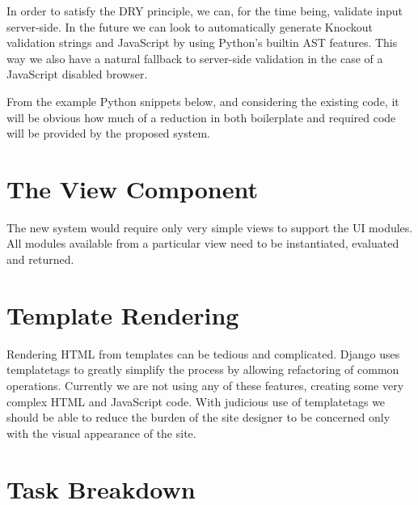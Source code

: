 \documentclass[12pt]{scrartcl}
\begin{document}
In order to satisfy the DRY principle, we can, for the time being, validate input server-side.
In the future we can look to automatically generate Knockout validation strings and JavaScript
by using Python's builtin AST features. This way we also have a natural fallback to server-side
validation in the case of a JavaScript disabled browser.

From the example Python snippets below, and considering the existing code, it will be obvious
how much of a reduction in both boilerplate and required code will be provided by the proposed
system.





\section{The View Component}

The new system would require only very simple views to support the UI modules. All modules
available from a particular view need to be instantiated, evaluated and returned.



\section{Template Rendering}

Rendering HTML from templates can be tedious and complicated. Django uses templatetags to greatly
simplify the process by allowing refactoring of common operations. Currently we are not using any
of these features, creating some very complex HTML and JavaScript code. With judicious use of
templatetags we should be able to reduce the burden of the site designer to be concerned only
with the visual appearance of the site.

\section{Task Breakdown}
\end{document}
